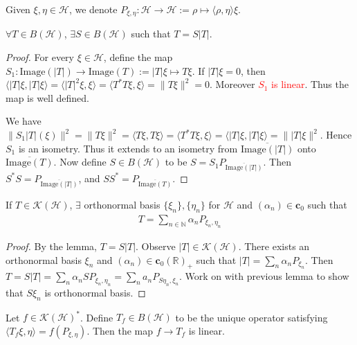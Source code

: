 \begin{definition}
  Given $\xi, \eta \in \mathcal{H}$, we denote $P_{\xi, \eta}:
  \mathcal{H} \to  \mathcal{H} := \rho \mapsto  \langle \rho ,  \eta
  \rangle  \xi$.
\end{definition}

\begin{lemma}
  $\forall T \in B(\mathcal{H})$, $\exists S \in B(\mathcal{H})$ such
  that $T = S|T|$.
\end{lemma}
\begin{proof}
  For every $\xi \in \mathcal{H}$, define the map $S_1 :
  \textrm{Image}(|T|) \to  \textrm{Image}(T) := |T|\xi \mapsto  T
  \xi$. If $|T|\xi = 0$, then $ \langle |T|\xi , |T|\xi \rangle =
  \langle |T|^2 \xi,  \xi \rangle = \langle T^*T \xi ,  \xi \rangle =
  \|T \xi\|^2 = 0$. Moreover \textcolor{red}{$S_1$ is linear}. Thus
  the map is well defined.

  We have $\|S_1 |T|(\xi)\|^2 = \|T \xi\|^2 = \langle T \xi ,  T \xi
  \rangle = \langle T^*T \xi ,  \xi \rangle  = \langle |T|\xi , |T|
  \xi \rangle = \||T|\xi\|^2$. Hence $S_1$ is an isometry. Thus it
  extends to an isometry from $\overline{\textrm{Image}(|T|)}$ onto
  $\overline{\textrm{Image}(T)}$. Now define $S \in B(\mathcal{H})$
  to be $S = S_1P_{\overline{ \textrm{Image}(|T|)}}$. Then $  S^*S =
  P_{\overline{ \textrm{Image}(|T|)}}$, and $SS^* = P_{\overline{
  \textrm{Image}(T)}}$.
\end{proof}

\begin{theorem}
  If $T \in \mathcal{K}(\mathcal{H})$, $\exists$ orthonormal basis
  $\{ \xi_n \}, \{ \eta_n \}$ for $\mathcal{H}$ and $(\alpha_n) \in
  \textbf{c}_0$ such that
  \begin{align*}
    T = \sum_{n \in \mathbb{N}} \alpha_n P_{\xi_n, \eta_n}
  \end{align*}
\end{theorem}
\begin{proof}
  By the lemma, $T = S|T|$. Observe $|T| \in
  \mathcal{K}(\mathcal{H})$. There exists an orthonormal basis
  $\xi_n$ and $(\alpha_n) \in \textbf{c}_0(\mathbb{R})_+$ such that
  $|T| = \sum_{n} \alpha_n P_{\xi_n}$. Then $T = S |T| = \sum_{n}
  \alpha_n SP_{\xi_n, \eta_n} = \sum_{n} a_n P_{S \eta_n, \xi_n}$.
  Work on with previous lemma to show that $S
  \xi_n$ is orthonormal basis.
\end{proof}

\begin{definition}
  Let $f \in \mathcal{K}(\mathcal{H})^*$. Define $T_f \in
  B(\mathcal{H})$ to be the unique operator satisfying $\langle T_f
  \xi ,  \eta \rangle = f(P_{\xi, \eta})$. Then the map $f \to T_f$ is linear.
\end{definition}
